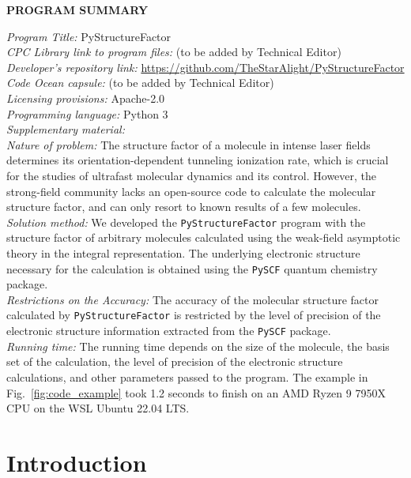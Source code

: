 \documentclass[preprint,12pt]{elsarticle} %
\begin{document}
{\bf \noindent PROGRAM SUMMARY} \\
\begin{small}
\noindent
{\em Program Title:} PyStructureFactor \\
{\em CPC Library link to program files:} (to be added by Technical Editor) \\
{\em Developer's repository link:} \url{https://github.com/TheStarAlight/PyStructureFactor} \\
{\em Code Ocean capsule:} (to be added by Technical Editor) \\
{\em Licensing provisions:} Apache-2.0 \\
{\em Programming language:} Python 3                                  \\
{\em Supplementary material:}                                 \\
{\em Nature of problem:} The structure factor of a molecule in intense laser fields determines its orientation-dependent tunneling ionization rate, which is crucial for the studies of ultrafast molecular dynamics and its control. However, the strong-field community lacks an open-source code to calculate the molecular structure factor, and can only resort to known results of a few molecules. \\
{\em Solution method:} We developed the \texttt{PyStructureFactor} program with the structure factor of arbitrary molecules calculated using the weak-field asymptotic theory in the integral representation. The underlying electronic structure necessary for the calculation is obtained using the \texttt{PySCF} quantum chemistry package. \\
{\em Restrictions on the Accuracy:} The accuracy of the molecular structure factor calculated by \texttt{PyStructureFactor} is restricted by the level of precision of the electronic structure information extracted from the \texttt{PySCF} package. \\
{\em Running time:} The running time depends on the size of the molecule, the basis set of the calculation, the level of precision of the electronic structure calculations, and other parameters passed to the program. The example in Fig.~\ref{fig:code_example} took 1.2 seconds to finish on an AMD Ryzen 9 7950X CPU on the WSL Ubuntu 22.04 LTS.
\end{small}


\section{Introduction}
\label{sec:intro}
\end{document}
